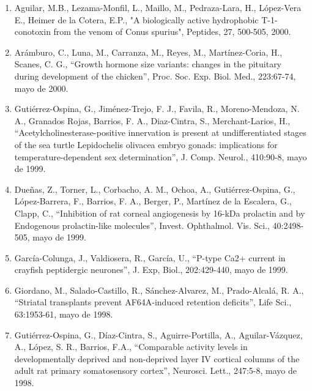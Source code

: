 \begin{enumerate}
\item Aguilar, M.B., Lezama-Monfil, L., Maillo, M., Pedraza-Lara, H., López-Vera E., Heimer de la Cotera, E.P., "A biologically active hydrophobic T-1-conotoxin 
from the venom of Conus spurius", Peptides, 27, 500-505,  2000.

\item Arámburo, C., Luna, M., Carranza, M., Reyes, M., Martínez-Coria, H., Scanes, C. G., “Growth hormone size variants: changes in the pituitary during 
development of the chicken”, Proc. Soc. Exp. Biol. Med., 223:67-74,  mayo de 2000.

\item Gutiérrez-Ospina, G., Jiménez-Trejo, F. J., Favila, R., Moreno-Mendoza, N. A., Granados Rojas, Barrios, F. A., Diaz-Cintra, S., Merchant-Larios, H., 
“Acetylcholinesterase-positive innervation is present at undifferentiated stages of the sea turtle Lepidochelis olivacea embryo gonads: implications for 
temperature-dependent sex determination”, J. Comp. Neurol., 410:90-8,  mayo de 1999.

\item Dueñas, Z., Torner, L., Corbacho, A. M., Ochoa, A., Gutiérrez-Ospina, G., López-Barrera, F., Barrios, F. A., Berger, P., Martínez de la Escalera, G., 
Clapp, 
C., “Inhibition of rat corneal angiogenesis by 16-kDa prolactin and by Endogenous prolactin-like molecules”, Invest. Ophthalmol. Vis. Sci., 40:2498-505,  
mayo de 1999.
\item García-Colunga, J., Valdiosera, R., García, U., “P-type Ca2+ current in crayfish peptidergic neurones”, J. Exp, Biol., 202:429-440,  mayo de 1999.

\item  Giordano, M., Salado-Castillo, R., Sánchez-Alvarez, M., Prado-Alcalá, R. A., “Striatal transplants prevent AF64A-induced retention deficits”, Life Sci., 
63:1953-61,  mayo de 1998.
\item Gutiérrez-Ospina, G., Díaz-Cintra, S., Aguirre-Portilla, A., Aguilar-Vázquez, A., López, S. R., Barrios, F.A., “Comparable activity levels in 
developmentally deprived and non-deprived layer IV cortical columns of the adult rat primary somatosensory cortex”, Neurosci. Lett., 247:5-8,  mayo de 1998.

\end{enumerate}


